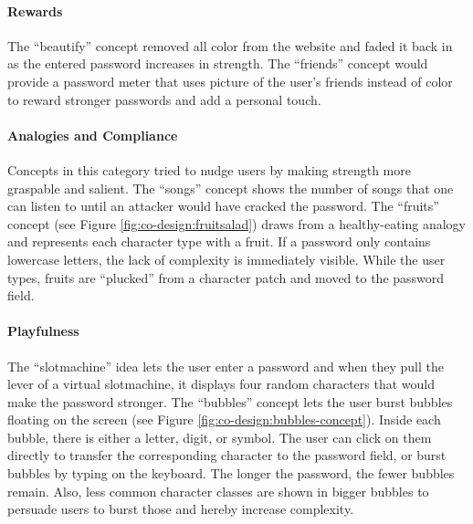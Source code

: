 \paragraph{Rewards} The ``beautify'' concept removed all color from the website and faded it back in as the entered password increases in strength. The ``friends'' concept would provide a password meter that uses picture of the user's friends instead of color to reward stronger passwords and add a personal touch. 
\paragraph{Analogies and Compliance}
Concepts in this category tried to nudge users by making strength more graspable and salient. The ``songs'' concept shows the number of songs that one can listen to until an attacker would have cracked the password. The ``fruits'' concept (see Figure \ref{fig:co-design:fruitsalad}) draws from a healthy-eating analogy and represents each character type with a fruit. If a password only contains lowercase letters, the lack of complexity is immediately visible. While the user types, fruits are ``plucked'' from a character patch and moved to the password field.
\paragraph{Playfulness} The ``slotmachine'' idea lets the user enter a password and when they pull the lever of a virtual slotmachine, it displays four random characters that would make the password stronger. The ``bubbles'' concept lets the user burst bubbles floating on the screen (see Figure \ref{fig:co-design:bubbles-concept}). Inside each bubble, there is either a letter, digit, or symbol. The user can click on them directly to transfer the corresponding character to the password field, or burst bubbles by typing on the keyboard. The longer the password, the fewer bubbles remain. Also, less common character classes are shown in bigger bubbles to persuade users to burst those and hereby increase complexity. 

